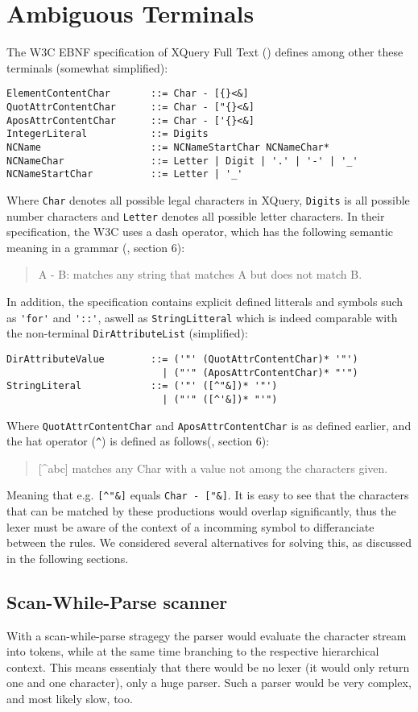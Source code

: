 \section{Ambiguous Terminals}
\label{sect:ambiguousgrammar:ambigTerm}
The W3C EBNF specification of XQuery Full Text (\cite{w3c01}) defines among other these terminals (somewhat simplified):
\begin{verbatim}
ElementContentChar       ::= Char - [{}<&]
QuotAttrContentChar      ::= Char - ["{}<&]
AposAttrContentChar      ::= Char - ['{}<&]
IntegerLiteral           ::= Digits
NCName                   ::= NCNameStartChar NCNameChar*
NCNameChar               ::= Letter | Digit | '.' | '-' | '_'
NCNameStartChar          ::= Letter | '_'
\end{verbatim}
Where \verb!Char! denotes all possible legal characters in XQuery, \verb!Digits! is all possible number characters and \verb!Letter! denotes all possible letter characters. In their specification, the W3C uses a dash operator, which has the following
semantic meaning in a grammar (\cite{w3c03}, section 6):
\begin{quote}
A - B: matches any string that matches A but does not match B.
\end{quote}
In addition, the specification contains explicit defined litterals and symbols such as \verb!'for'! and \verb!'::'!, aswell as \verb!StringLitteral! which is indeed comparable with the non-terminal \verb!DirAttributeList! (simplified):
\begin{verbatim}
DirAttributeValue        ::= ('"' (QuotAttrContentChar)* '"')
                           | ("'" (AposAttrContentChar)* "'")
StringLiteral            ::= ('"' ([^"&])* '"') 
                           | ("'" ([^'&])* "'")
\end{verbatim}
Where \verb!QuotAttrContentChar! and \verb!AposAttrContentChar! is as defined earlier, and the hat operator (\verb!^!) is defined as follows(\cite{w3c03}, section 6):
\begin{quote}
[\^{}abc] matches any Char with a value not among the characters given.
\end{quote}
Meaning that e.g. \verb![^"&]! equals \verb!Char - ["&]!. It is easy to see that the characters that can be matched by these productions would overlap significantly, thus the lexer must be aware of the context of a incomming symbol to differanciate between the rules. We considered several alternatives for solving this, as discussed in the following sections.

\subsection{Scan-While-Parse scanner}
\label{sect:ambiguousgrammar:scanWhileParse}
With a scan-while-parse stragegy the parser would evaluate the character stream into tokens, while at the same time branching to the respective hierarchical context. This means essentialy that there would be no lexer (it would only return one and one character), only a huge parser. Such a parser would be very complex, and most likely slow, too.


